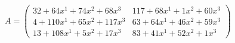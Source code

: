 \documentclass[preview]{standalone}
\begin{document}
\begin{align*}
A = \begin{pmatrix}32 + 64x^{1} + 74x^{2} + 68x^{3} & 117 + 68x^{1} + 1x^{2} + 60x^{3} \\ 4 + 110x^{1} + 65x^{2} + 117x^{3} & 63 + 64x^{1} + 46x^{2} + 59x^{3} \\ 13 + 108x^{1} + 5x^{2} + 17x^{3} & 83 + 41x^{1} + 52x^{2} + 1x^{3}\end{pmatrix}
\end{align*}
\end{document}
